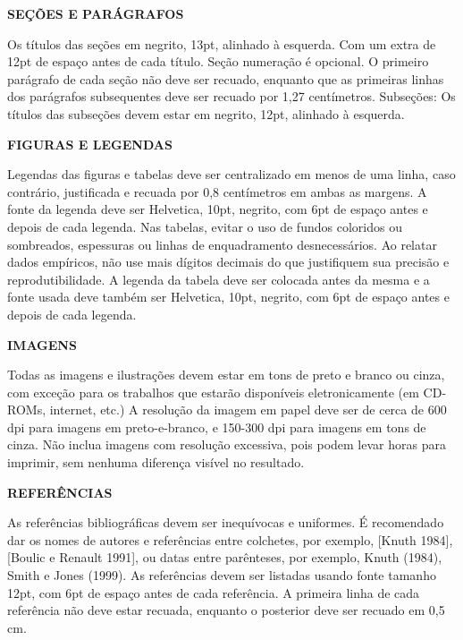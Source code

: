 \documentclass[a4paper,10pt]{article}
\begin{document}
\begin{flushleft}
\textbf{SEÇÕES E PARÁGRAFOS}
\end{flushleft}

Os títulos das seções em negrito, 13pt, alinhado à esquerda. Com um extra de 12pt de espaço antes de cada título. Seção numeração é opcional. O primeiro parágrafo de cada seção não deve ser recuado, enquanto que as primeiras linhas dos parágrafos subsequentes deve ser recuado por 1,27 centímetros. Subseções: Os títulos das subseções devem estar em negrito, 12pt, alinhado à esquerda.\\

\pagebreak

\begin{flushleft}
\textbf{FIGURAS E LEGENDAS}
\end{flushleft}

Legendas das figuras e tabelas deve ser centralizado em menos de uma linha, caso contrário, justificada e recuada por 0,8 centímetros em ambas as margens. A fonte da legenda deve ser Helvetica, 10pt, negrito, com 6pt de espaço antes e depois de cada legenda. Nas tabelas, evitar o uso de fundos coloridos ou sombreados, espessuras ou linhas de enquadramento desnecessários. Ao relatar dados empíricos, não use mais dígitos decimais do que justifiquem sua precisão e reprodutibilidade. A legenda da tabela deve ser colocada antes da mesma e a fonte usada deve também ser Helvetica, 10pt, negrito, com 6pt de espaço antes e depois de cada legenda.\\ 

\begin{flushleft}
\textbf{IMAGENS}
\end{flushleft}

Todas as imagens e ilustrações devem estar em tons de preto e branco ou cinza, com exceção para os trabalhos que estarão disponíveis eletronicamente (em CD-ROMs, internet, etc.) A resolução da imagem em papel deve ser de cerca de 600 dpi para imagens em preto-e-branco, e 150-300 dpi para imagens em tons de cinza. Não inclua imagens com resolução excessiva, pois podem levar horas para imprimir, sem nenhuma diferença visível no resultado.\\

\begin{flushleft}
\textbf{REFERÊNCIAS}
\end{flushleft}

As referências bibliográficas devem ser inequívocas e uniformes. É recomendado dar os nomes de autores e referências entre colchetes, por exemplo, [Knuth 1984], [Boulic e Renault 1991], ou datas entre parênteses, por exemplo, Knuth (1984), Smith e Jones (1999). As referências devem ser listadas usando fonte tamanho 12pt, com 6pt de espaço antes de cada referência. A primeira linha de cada referência não deve estar recuada, enquanto o posterior deve ser recuado em 0,5 cm.\\

 
\end{document}

